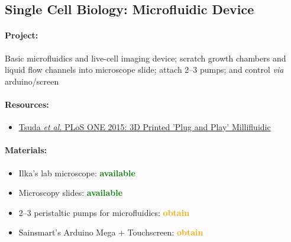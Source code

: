 \documentclass[12pt,a4paper]{scrartcl}
\newcommand{\obtain}[0]{\textcolor{orange}{\textbf{obtain}}}
\newcommand{\avail}[0]{\textcolor{green}{\textbf{available}}}
\begin{document}
\newpage
\subsection{Single Cell Biology: Microfluidic Device} 
\label{micro}

\paragraph{Project:} Basic microfluidics and live-cell imaging device;
scratch growth chambers and liquid flow channels into microscope slide;
attach 2--3 pumps; and control \textit{via} arduino/screen

\paragraph{Resources:}
\begin{itemize}
\item \href{http://www.ncbi.nlm.nih.gov/pmc/articles/PMC4641590/}{Tsuda \textit{et al.} PLoS ONE 2015: 3D Printed 'Plug and Play' Millifluidic}
\end{itemize}

\paragraph{Materials:}
\begin{itemize}
\item Ilka's lab microscope: \avail{}
\item Microscopy slides: \avail{}
\item 2--3 peristaltic pumps for microfluidics: \obtain{}
\item Sainsmart's Arduino Mega + Touchscreen: \obtain{}
\end{itemize}


\clearpage

%

\end{document}

